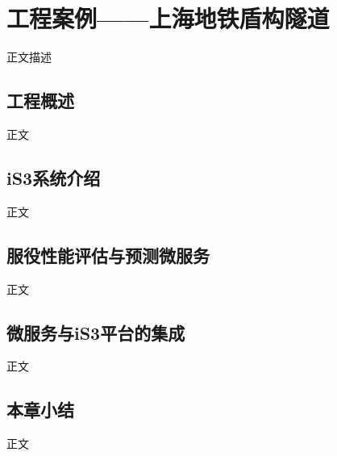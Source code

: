 \chapter{工程案例——上海地铁盾构隧道}
\label{chap:case}

正文描述

\section{工程概述}

正文




\section{iS3系统介绍}

正文




\section{服役性能评估与预测微服务}

正文




\section{微服务与iS3平台的集成}

正文





\section{本章小结}

正文